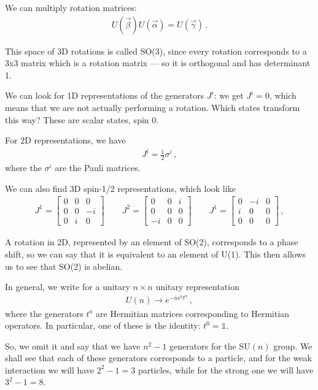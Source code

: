 \documentclass[main.tex]{subfiles}
\begin{document}
We can multiply rotation matrices: 
%
\begin{align}
U(\vec{\beta}) U(\vec{\alpha}) = U(\vec{\gamma})
\,.
\end{align}

This space of 3D rotations is called SO(3), since every rotation corresponds to a 3x3 matrix which is a rotation matrix --- so it is orthogonal and has determinant 1.

We can look for 1D representations of the generators \(J^{i}\): we get \(J^{i} = 0\), which means that we are not actually performing a rotation.
Which states transform this way? These are scalar states, spin 0. 

For 2D representations, we have 
%
\begin{align}
J^{i} =\frac{1}{2} \sigma^{i} 
\,,
\end{align}
%
where the \(\sigma^{i}\) are the Pauli matrices.

We can also find 3D spin-1/2 representations, which look like 
%
\begin{subequations}
\begin{align}
J^{1}= \left[\begin{array}{ccc}
0 & 0 & 0 \\ 
0 & 0 & -i \\ 
0 & i & 0
\end{array}\right] 
\qquad 
J^{2}= \left[\begin{array}{ccc}
0 & 0 & i \\ 
0 & 0 & 0 \\ 
-i & 0 & 0
\end{array}\right] 
\qquad 
J^{1}= \left[\begin{array}{ccc}
0 & -i & 0 \\ 
i & 0 & 0 \\ 
0 & 0 & 0
\end{array}\right] 
\,,
\end{align}
\end{subequations}
%


A rotation in 2D, represented by an element of SO(2), corresponds to a phase shift, so we can say that it is equivalent to an element of U(1).
This then allows us to see that SO(2) is abelian. 

In general, we write for a unitary \(n \times n\) unitary representation
%
\begin{align}
U(n) \rightarrow e^{-i \alpha^{n} t^{a}}
\,,
\end{align}
%
where the generators \(t^{a}\) are Hermitian matrices corresponding to Hermitian operators. 
In particular, one of these is the identity: \(t^{0} = \mathbb{1}\). 

So, we omit it and  say that we have \(n^2-1\) generators for the SU\((n)\) group.
We shall see that each of these generators corresponds to a particle, and for the weak interaction we will have \(2^2-1 = 3\) particles, while for the strong one we will have \(3^2-1=8\). 
\end{document}
